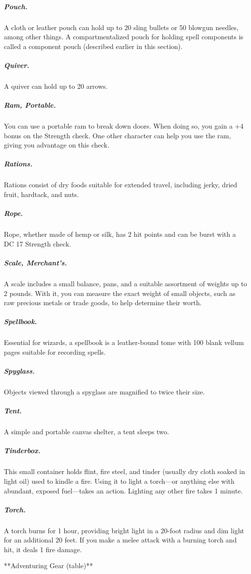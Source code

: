 \subparagraph*{Pouch.} A cloth or leather pouch can hold up to 20 sling bullets or 50 blowgun needles, among other things. A compartmentalized pouch for holding spell components is called a component pouch (described earlier in this section). 

\subparagraph*{Quiver.} A quiver can hold up to 20 arrows.

\subparagraph*{Ram, Portable.} You can use a portable ram to break down doors. When doing so, you gain a +4 bonus on the Strength check. One other character can help you use the ram, giving you advantage on this check.

\subparagraph*{Rations.} Rations consist of dry foods suitable for extended travel, including jerky, dried fruit, hardtack, and nuts.

\subparagraph*{Rope.} Rope, whether made of hemp or silk, has 2 hit points and can be burst with a DC 17 Strength check.

\subparagraph*{Scale, Merchant's.} A scale includes a small balance, pans, and a suitable assortment of weights up to 2 pounds. With it, you can measure the exact weight of small objects, such as raw precious metals or trade goods, to help determine their worth.

\subparagraph*{Spellbook.} Essential for wizards, a spellbook is a leather-bound tome with 100 blank vellum pages suitable for recording spells.

\subparagraph*{Spyglass.} Objects viewed through a spyglass are magnified to twice their size.

\subparagraph*{Tent.} A simple and portable canvas shelter, a tent sleeps two.

\subparagraph*{Tinderbox.} This small container holds flint, fire steel, and tinder (usually dry cloth soaked in light oil) used to kindle a fire. Using it to light a torch—or anything else with abundant, exposed fuel—takes an action. Lighting any other fire takes 1 minute.

\subparagraph*{Torch.} A torch burns for 1 hour, providing bright light in a 20-foot radius and dim light for an additional 20 feet. If you make a melee attack with a burning torch and hit, it deals 1 fire damage.

**Adventuring Gear (table)**

